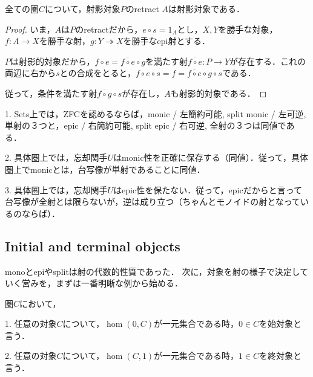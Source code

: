 \documentclass[uplatex, 12pt, dvipdfmx]{jsarticle}
\begin{document}
\begin{proposition*}[射影性の引き戻し]
    全ての圏$C$について，射影対象$P$のretract $A$は射影対象である．
\end{proposition*}
\begin{proof}
    いま，$A$は$P$のretractだから，$e\circ s=1_A$とし，$X,Y$を勝手な対象，$f:A\to X$を勝手な射，$g:Y\twoheadrightarrow X$を勝手なepi射とする．
    \begin{center}
    \end{center}
    $P$は射影的対象だから，$f\circ e=\overline{f\circ e}\circ g$を満たす射$\overline{f\circ e}:P\to Y$が存在する．これの両辺に右から$s$との合成をとると，$f\circ e\circ s=f=\overline{f\circ e}\circ g\circ s$である．
    
    従って，条件を満たす射$\overline{f\circ g}\circ s$が存在し，$A$も射影的対象である．
\end{proof}

\begin{screen}
    1. Sets上では，ZFCを認めるならば，monic / 左簡約可能, split monic / 左可逆, 単射の３つと，epic / 右簡約可能, split epic / 右可逆, 全射の３つは同値である．

    2. 具体圏上では，忘却関手$U$はmonic性を正確に保存する（同値）．従って，具体圏上でmonicとは，台写像が単射であることに同値．

    3. 具体圏上では，忘却関手$U$はepic性を保たない．従って，epicだからと言って台写像が全射とは限らないが，逆は成り立つ（ちゃんとモノイドの射となっているのならば）．
\end{screen}

\subsection{Initial and terminal objects}

monoとepiやsplitは射の代数的性質であった．
次に，対象を射の様子で決定していく営みを，まずは一番明晰な例から始める．

\begin{definition}
    圏$C$において，

    1. 任意の対象$C$について，$\hom(0,C)$が一元集合である時，$0\in C$を始対象と言う．

    2. 任意の対象$C$について，$\hom(C,1)$が一元集合である時，$1\in C$を終対象と言う．
\end{definition}
\end{document}
